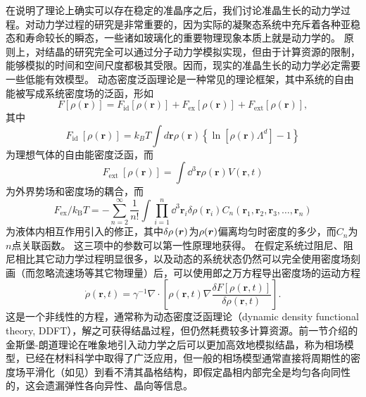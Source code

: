 \documentclass[hyperref, UTF8, a4paper]{ctexart}
\begin{document}
在说明了理论上确实可以存在稳定的准晶序之后，我们讨论准晶生长的动力学过程。对动力学过程的研究是非常重要的，因为实际的凝聚态系统中充斥着各种亚稳态和寿命较长的瞬态\cite{PhysRevB.75.064107}，一些诸如玻璃化的重要物理现象本质上就是动力学的\cite{mct-primer}。
原则上，对结晶的研究完全可以通过分子动力学模拟实现，但由于计算资源的限制，能够模拟的时间和空间尺度都极其受限\cite{PhysRevLett.88.245701}。因而，现实的准晶生长的动力学必定需要一些低能有效模型。
动态密度泛函理论是一种常见的理论框架\cite{pfc2009,PhysRevB.75.064107}，其中系统的自由能被写成系统密度场的泛函，形如
\begin{equation}
    F[\rho(\boldsymbol{r})]=F_{\mathrm{id}}[\rho(\boldsymbol{r})]+F_{\mathrm{ex}}[\rho(\boldsymbol{r})]+F_{\mathrm{ext}}[\rho(\boldsymbol{r})],
\end{equation}
其中
\begin{equation}
    F_{\text {id }}[\rho(\boldsymbol{r})]=k_{B} T \int d \boldsymbol{r} \rho(\boldsymbol{r})\left\{\ln \left[\rho(\boldsymbol{r}) \Lambda^{d}\right]-1\right\}
    \label{eq:id-free-energy}
\end{equation}
为理想气体的自由能密度泛函，而
\begin{equation}
    F_{\text {ext }}[\rho(\boldsymbol{r})]=\int \dd^3 \boldsymbol{r} \rho(\boldsymbol{r}) V(\boldsymbol{r}, t)
\end{equation}
为外界势场和密度场的耦合，而
\begin{equation}
    {F}_\text{ex} / k_\text{B} T=-\sum_{n=2}^{\infty} \frac{1}{n !} \int \prod_{i=1}^{n} \dd^3 \boldsymbol{r}_{i} \delta \rho\left(\boldsymbol{r}_{i}\right) C_{n}\left(\boldsymbol{r}_{1}, \boldsymbol{r}_{2}, \boldsymbol{r}_{3}, \ldots, \boldsymbol{r}_{n} \right)
    \label{eq:ex-free-energy}
\end{equation}
为液体内相互作用引入的修正，其中$\var{\rho}(\vb*{r})$为$\rho(\vb*{r})$偏离均匀时密度的多少，而$C_n$为$n$点关联函数。
这三项中的参数可以第一性原理地获得。
在假定系统过阻尼、阻尼相比其它动力学过程明显很多，以及动态的系统状态仍然可以完全使用密度场刻画（而忽略流速场等其它物理量）后，可以使用郎之万方程导出密度场的运动方程\cite{pfc2009,PhysRevB.75.064107}
\begin{equation}
    \dot{\rho}(\mathbf{r}, t)=\gamma^{-1} \nabla \cdot\left[\rho(\mathbf{r}, t) \nabla \frac{\delta F[\rho(\mathbf{r}, t)]}{\delta \rho(\mathbf{r}, t)}\right].
    \label{eq:ddft}
\end{equation}
这是一个非线性的方程，通常称为动态密度泛函理论（dynamic density functional theory, DDFT），解之可获得结晶过程\cite{Neuhaus_2014}，但仍然耗费较多计算资源。前一节介绍的金斯堡-朗道理论在唯象地引入动力学之后可以更加高效地模拟结晶，称为相场模型，已经在材料科学中取得了广泛应用，但一般的相场模型通常直接将周期性的密度场平滑化（如见）到看不清其晶格结构，即假定晶相内部完全是均匀各向同性的，这会遗漏弹性各向异性、晶向等信息。
\end{document}
